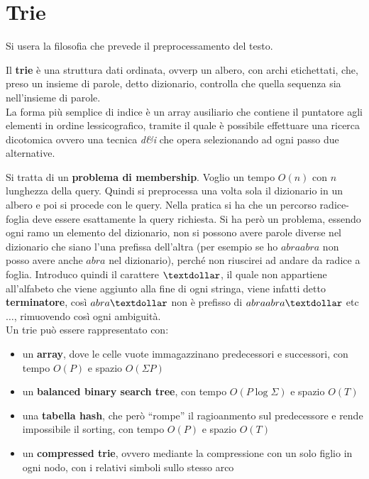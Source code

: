 \documentclass[a4paper,12pt, oneside]{book}
\begin{document}
\section{Trie}
Si usera la filosofia che prevede il preprocessamento del testo.
\begin{definizione}
  Il \textbf{trie} è una struttura dati ordinata, ovverp un albero,
  con archi etichettati, che, preso un insieme
  di parole, detto dizionario, controlla che
  quella sequenza sia nell'insieme di parole. \\
  La forma più semplice di indice è un array ausiliario
  che contiene il puntatore agli elementi in ordine lessicografico,
  tramite il quale è possibile effettuare una ricerca dicotomica
  ovvero una tecnica \textit{d\&i} che opera selezionando ad ogni
  passo due alternative.  
\end{definizione}
Si tratta di un
\textbf{problema di membership}. Voglio un tempo $O(n)$ con $n$
lunghezza della query. Quindi si preprocessa una volta sola il
dizionario in un albero e poi si procede con le query. Nella pratica
si ha che un percorso radice-foglia deve essere esattamente la query
richiesta. Si ha però un problema, essendo ogni ramo un elemento del
dizionario, non si possono avere parole diverse nel dizionario che
siano l'una prefissa dell'altra (per esempio se ho $abraabra$ non
posso avere anche $abra$ nel dizionario), perché non riuscirei ad
andare da radice a foglia. Introduco quindi il carattere $\textdollar$, il quale
non appartiene all'alfabeto che viene aggiunto alla fine di ogni
stringa, viene infatti detto \textbf{terminatore}, così $abra\textdollar$ non è
prefisso di $abraabra\textdollar$ etc$\ldots$, rimuovendo così ogni
ambiguità.\\ 
Un trie può essere rappresentato con:
\begin{itemize}
  \item un \textbf{array}, dove le celle vuote immagazzinano
  predecessori e successori, con tempo $O(P)$ e spazio $O(\Sigma P)$
  \item un \textbf{balanced binary search tree}, con tempo
  $O(P\log\Sigma)$ e spazio $O(T)$
  \item una \textbf{tabella hash}, che però ``rompe'' il ragioanmento
  sul predecessore e rende impossibile il sorting, con tempo $O(P)$ e
  spazio $O(T)$
  \item un \textbf{compressed trie}, ovvero mediante la compressione
  con un solo figlio in ogni nodo, con i relativi simboli sullo stesso
  arco 
\end{itemize}
\end{document}
